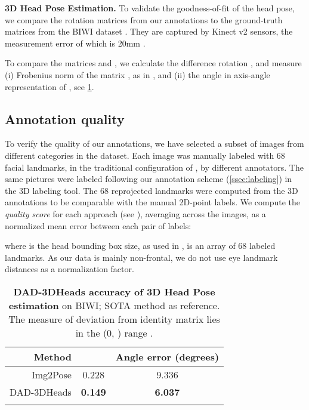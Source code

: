 \documentclass[10pt,twocolumn,letterpaper]{article}
\begin{document}
\textbf{3D Head Pose Estimation.} To validate the  goodness-of-fit of the head pose, we compare the rotation matrices from our annotations to the ground-truth matrices from the BIWI dataset \cite{BIWI}. They are captured by Kinect v2 sensors, the measurement error of which is 20mm \cite{Kinect_v2}.

To compare the matrices  and , we calculate the difference rotation , and measure (i) Frobenius norm of the matrix , as in \cite{rot_matrix_metrics}, and (ii) the angle in axis-angle representation of , see \cref{t:3dpose_GT}.

\subsection{Annotation quality}\label{ssec:consistency}


To verify the quality of our annotations, we have selected a subset of  images from different categories in the dataset. 
Each image was manually labeled with 68 facial landmarks, 
in the traditional configuration of \cite{multipie}, by  different annotators. 
The same pictures were labeled following our annotation scheme (\cref{ssec:labeling}) in the 3D labeling tool. 
The 68 reprojected landmarks were computed from the 3D annotations to be comparable with the manual 2D-point labels. 
We compute the \textit{quality score}  for each approach (see ), averaging across the images, as a normalized mean error between each pair of labels:
 
where  is the head bounding box size, as used in \cite{NME_bbox1, NME_bbox2},  is an array of 68 labeled landmarks. 
As our data is mainly non-frontal, we do not use eye landmark distances as a normalization factor.
\begin{table}[t]
\footnotesize
\renewcommand{\arraystretch}{0.95}
\centering
\begin{tabular}{r|c|c}
\noalign{\smallskip}
Method &  & Angle error (degrees)\\
\hline
Img2Pose \cite{img2pose} & 0.228 & 9.336  \\
DAD-3DHeads & \textbf{0.149} & \textbf{6.037} \\ \noalign{\smallskip}
\end{tabular}
\caption{\textbf{DAD-3DHeads accuracy of 3D Head Pose estimation} on BIWI\cite{BIWI}; SOTA method as reference. The measure of  deviation from identity matrix lies in the (0, ) range \cite{rot_matrix_metrics}.}
\label{t:3dpose_GT}
\end{table}
 
\end{document}
